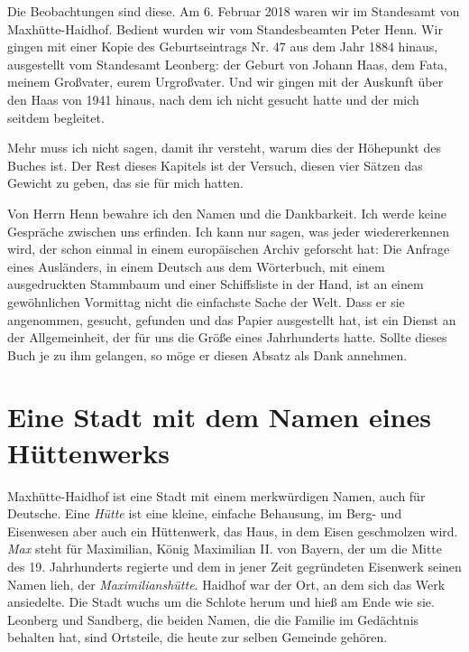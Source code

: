 \documentclass[
  ngerman,
  11pt,
  openany]{book}
\begin{document}
Die Beobachtungen sind diese. Am 6. Februar 2018 waren wir im Standesamt
von Maxhütte-Haidhof. Bedient wurden wir vom Standesbeamten Peter Henn.
Wir gingen mit einer Kopie des Geburtseintrags Nr. 47 aus dem Jahr 1884
hinaus, ausgestellt vom Standesamt Leonberg: der Geburt von Johann Haas,
dem Fata, meinem Großvater, eurem Urgroßvater. Und wir gingen mit der
Auskunft über den Haas von 1941 hinaus, nach dem ich nicht gesucht hatte
und der mich seitdem begleitet.

Mehr muss ich nicht sagen, damit ihr versteht, warum dies der Höhepunkt
des Buches ist. Der Rest dieses Kapitels ist der Versuch, diesen vier
Sätzen das Gewicht zu geben, das sie für mich hatten.

Von Herrn Henn bewahre ich den Namen und die Dankbarkeit. Ich werde
keine Gespräche zwischen uns erfinden. Ich kann nur sagen, was jeder
wiedererkennen wird, der schon einmal in einem europäischen Archiv
geforscht hat: Die Anfrage eines Ausländers, in einem Deutsch aus dem
Wörterbuch, mit einem ausgedruckten Stammbaum und einer Schiffsliste in
der Hand, ist an einem gewöhnlichen Vormittag nicht die einfachste Sache
der Welt. Dass er sie angenommen, gesucht, gefunden und das Papier
ausgestellt hat, ist ein Dienst an der Allgemeinheit, der für uns die
Größe eines Jahrhunderts hatte. Sollte dieses Buch je zu ihm gelangen,
so möge er diesen Absatz als Dank annehmen.

\section{Eine Stadt mit dem Namen eines
Hüttenwerks}\label{eine-stadt-mit-dem-namen-eines-huxfcttenwerks}

Maxhütte-Haidhof ist eine Stadt mit einem merkwürdigen Namen, auch für
Deutsche. Eine \emph{Hütte} ist eine kleine, einfache Behausung, im
Berg- und Eisenwesen aber auch ein Hüttenwerk, das Haus, in dem Eisen
geschmolzen wird. \emph{Max} steht für Maximilian, König Maximilian II.
von Bayern, der um die Mitte des 19. Jahrhunderts regierte und dem in
jener Zeit gegründeten Eisenwerk seinen Namen lieh, der
\emph{Maximilianshütte}. Haidhof war der Ort, an dem sich das Werk
ansiedelte. Die Stadt wuchs um die Schlote herum und hieß am Ende wie
sie. Leonberg und Sandberg, die beiden Namen, die die Familie im
Gedächtnis behalten hat, sind Ortsteile, die heute zur selben Gemeinde
gehören.
\end{document}
